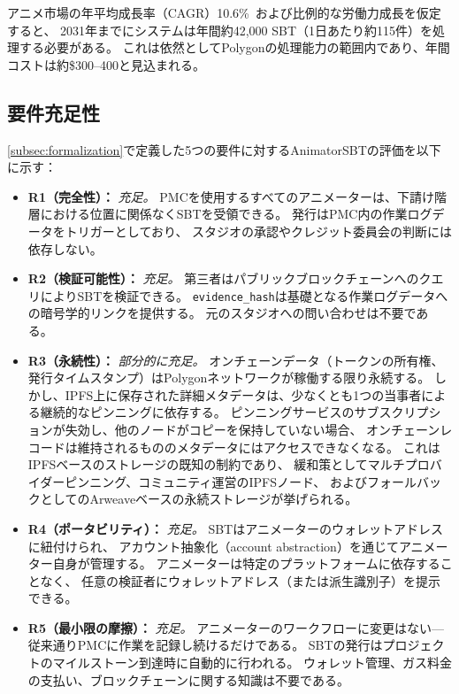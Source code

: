 アニメ市場の年平均成長率（CAGR）10.6\%~\cite{mordor2026anime}および比例的な労働力成長を仮定すると、
2031年までにシステムは年間約42{,}000 SBT（1日あたり約115件）を処理する必要がある。
これは依然としてPolygonの処理能力の範囲内であり、年間コストは約\$300--400と見込まれる。

\subsection{要件充足性}
\label{subsec:requirements_eval}

\cref{subsec:formalization}で定義した5つの要件に対するAnimatorSBTの評価を以下に示す：

\begin{itemize}
  \item \textbf{R1（完全性）：} \textit{充足。}
    PMCを使用するすべてのアニメーターは、下請け階層における位置に関係なくSBTを受領できる。
    発行はPMC内の作業ログデータをトリガーとしており、
    スタジオの承認やクレジット委員会の判断には依存しない。

  \item \textbf{R2（検証可能性）：} \textit{充足。}
    第三者はパブリックブロックチェーンへのクエリによりSBTを検証できる。
    \texttt{evidence\_hash}は基礎となる作業ログデータへの暗号学的リンクを提供する。
    元のスタジオへの問い合わせは不要である。

  \item \textbf{R3（永続性）：} \textit{部分的に充足。}
    オンチェーンデータ（トークンの所有権、発行タイムスタンプ）はPolygonネットワークが稼働する限り永続する。
    しかし、IPFS上に保存された詳細メタデータは、少なくとも1つの当事者による継続的なピンニングに依存する。
    ピンニングサービスのサブスクリプションが失効し、他のノードがコピーを保持していない場合、
    オンチェーンレコードは維持されるもののメタデータにはアクセスできなくなる。
    これはIPFSベースのストレージの既知の制約であり、
    緩和策としてマルチプロバイダーピンニング、コミュニティ運営のIPFSノード、
    およびフォールバックとしてのArweaveベースの永続ストレージが挙げられる。

  \item \textbf{R4（ポータビリティ）：} \textit{充足。}
    SBTはアニメーターのウォレットアドレスに紐付けられ、
    アカウント抽象化（account abstraction）を通じてアニメーター自身が管理する。
    アニメーターは特定のプラットフォームに依存することなく、
    任意の検証者にウォレットアドレス（または派生識別子）を提示できる。

  \item \textbf{R5（最小限の摩擦）：} \textit{充足。}
    アニメーターのワークフローに変更はない---従来通りPMCに作業を記録し続けるだけである。
    SBTの発行はプロジェクトのマイルストーン到達時に自動的に行われる。
    ウォレット管理、ガス料金の支払い、ブロックチェーンに関する知識は不要である。
\end{itemize}

